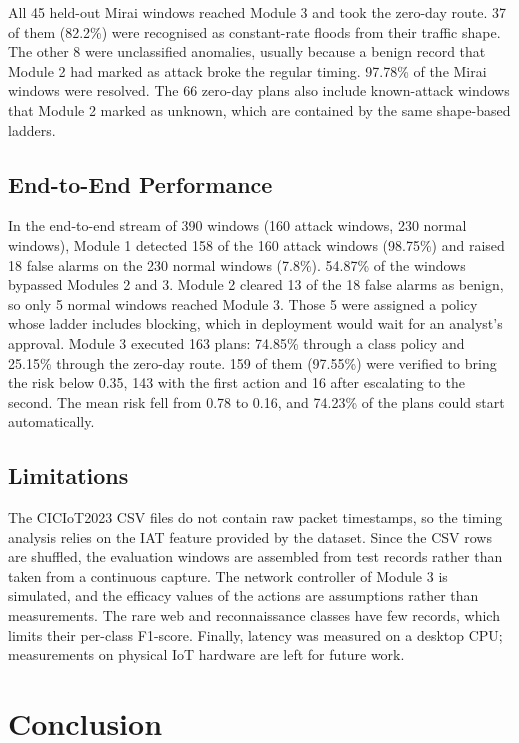 \documentclass[]{interact}
\theoremstyle{plain}%
\theoremstyle{definition}
\theoremstyle{remark}
\begin{document}
All 45 held-out Mirai windows reached Module 3 and took the zero-day route. 37 of them (82.2\%) were recognised as constant-rate floods from their traffic shape. The other 8 were unclassified anomalies, usually because a benign record that Module 2 had marked as attack broke the regular timing. 97.78\% of the Mirai windows were resolved. The 66 zero-day plans also include known-attack windows that Module 2 marked as unknown, which are contained by the same shape-based ladders.

\subsection{End-to-End Performance}
In the end-to-end stream of 390 windows (160 attack windows, 230 normal windows), Module 1 detected 158 of the 160 attack windows (98.75\%) and raised 18 false alarms on the 230 normal windows (7.8\%). 54.87\% of the windows bypassed Modules 2 and 3. Module 2 cleared 13 of the 18 false alarms as benign, so only 5 normal windows reached Module 3. Those 5 were assigned a policy whose ladder includes blocking, which in deployment would wait for an analyst's approval. Module 3 executed 163 plans: 74.85\% through a class policy and 25.15\% through the zero-day route. 159 of them (97.55\%) were verified to bring the risk below 0.35, 143 with the first action and 16 after escalating to the second. The mean risk fell from 0.78 to 0.16, and 74.23\% of the plans could start automatically.

\subsection{Limitations}
The CICIoT2023 CSV files do not contain raw packet timestamps, so the timing analysis relies on the IAT feature provided by the dataset. Since the CSV rows are shuffled, the evaluation windows are assembled from test records rather than taken from a continuous capture. The network controller of Module 3 is simulated, and the efficacy values of the actions are assumptions rather than measurements. The rare web and reconnaissance classes have few records, which limits their per-class F1-score. Finally, latency was measured on a desktop CPU; measurements on physical IoT hardware are left for future work.

\section{Conclusion}
\end{document}
